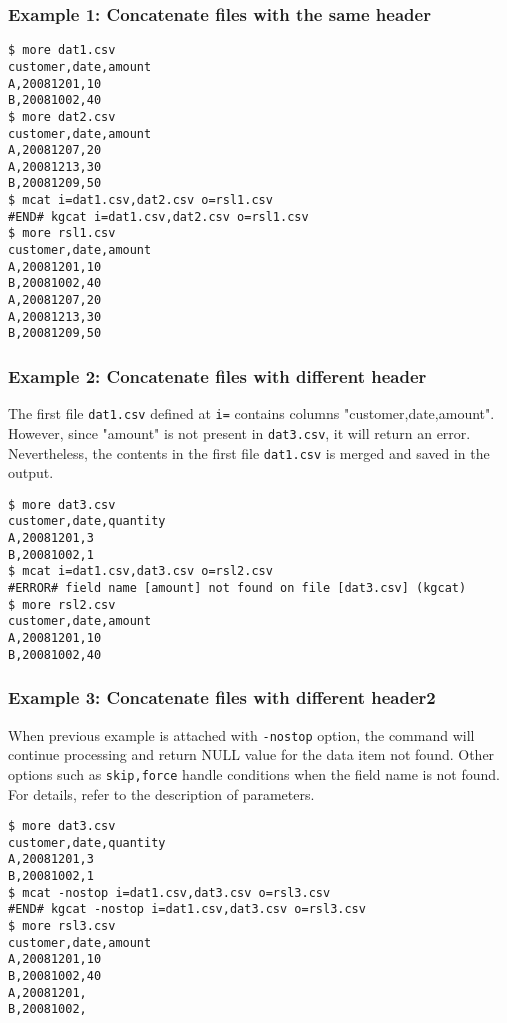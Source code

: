 \subsubsection*{Example 1: Concatenate files with the same header}



\begin{Verbatim}[baselinestretch=0.7,frame=single]
$ more dat1.csv
customer,date,amount
A,20081201,10
B,20081002,40
$ more dat2.csv
customer,date,amount
A,20081207,20
A,20081213,30
B,20081209,50
$ mcat i=dat1.csv,dat2.csv o=rsl1.csv
#END# kgcat i=dat1.csv,dat2.csv o=rsl1.csv
$ more rsl1.csv
customer,date,amount
A,20081201,10
B,20081002,40
A,20081207,20
A,20081213,30
B,20081209,50
\end{Verbatim}
\subsubsection*{Example 2: Concatenate files with different header}

The first file \verb|dat1.csv| defined at \verb|i=| contains columns "customer,date,amount". However, since "amount" is not present in \verb|dat3.csv|, it will return an error. Nevertheless, the contents in the first file \verb|dat1.csv| is merged and saved in the output.


\begin{Verbatim}[baselinestretch=0.7,frame=single]
$ more dat3.csv
customer,date,quantity
A,20081201,3
B,20081002,1
$ mcat i=dat1.csv,dat3.csv o=rsl2.csv
#ERROR# field name [amount] not found on file [dat3.csv] (kgcat)
$ more rsl2.csv
customer,date,amount
A,20081201,10
B,20081002,40
\end{Verbatim}
\subsubsection*{Example 3: Concatenate files with different header2}

When previous example is attached with \verb|-nostop| option, the command will continue processing and return NULL value for the data item not found. Other options such as \verb|skip,force| handle conditions when the field name is not found. For details, refer to the description of parameters.


\begin{Verbatim}[baselinestretch=0.7,frame=single]
$ more dat3.csv
customer,date,quantity
A,20081201,3
B,20081002,1
$ mcat -nostop i=dat1.csv,dat3.csv o=rsl3.csv
#END# kgcat -nostop i=dat1.csv,dat3.csv o=rsl3.csv
$ more rsl3.csv
customer,date,amount
A,20081201,10
B,20081002,40
A,20081201,
B,20081002,
\end{Verbatim}
